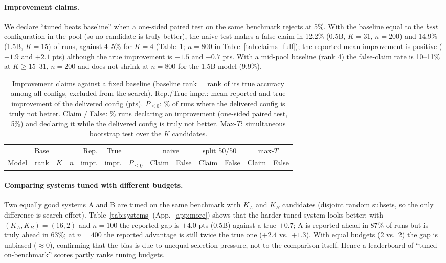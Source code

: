 \paragraph{Improvement claims.}
We declare ``tuned beats baseline'' when a one-sided paired test on the same benchmark rejects at 5\%. With the baseline equal to the \emph{best} configuration in the pool (so no candidate is truly better), the naive test makes a false claim in 12.2\% (0.5B, $K{=}31$, $n{=}200$) and 14.9\% (1.5B, $K{=}15$) of runs, against 4--5\% for $K{=}4$ (Table~\ref{tab:claims}; $n{=}800$ in Table~\ref{tab:claims_full}); the reported mean improvement is positive ($+1.9$ and $+2.1$ pts) although the true improvement is $-1.5$ and $-0.7$ pts.
With a mid-pool baseline (rank 4) the false-claim rate is 10--11\% at $K\ge15$--31, $n{=}200$ and does not shrink at $n=800$ for the 1.5B model (9.9\%).
\begin{table}[t]
\caption{Improvement claims against a fixed baseline (baseline rank = rank of its true accuracy among all configs, excluded from the search). Rep./True impr.: mean reported and true improvement of the delivered config (pts). $P_{\le0}$: \% of runs where the delivered config is truly not better. Claim / False: \% runs declaring an improvement (one-sided paired test, 5\%) and declaring it while the delivered config is truly not better. Max-$T$: simultaneous bootstrap test over the $K$ candidates.}\label{tab:claims}
\centering\footnotesize\setlength{\tabcolsep}{2.8pt}
\begin{tabular}{lrrrrrrrrrrrr}
\toprule & Base & & & Rep. & True & & \multicolumn{2}{c}{naive} & \multicolumn{2}{c}{split 50/50} & \multicolumn{2}{c}{max-$T$}\\
\cmidrule(lr){8-9}\cmidrule(lr){10-11}\cmidrule(lr){12-13}
Model & rank & $K$ & $n$ & impr. & impr. & $P_{\le0}$ & Claim & False & Claim & False & Claim & False\\ \midrule
\end{tabular}
\end{table}
\paragraph{Comparing systems tuned with different budgets.}
Two equally good systems A and B are tuned on the same benchmark with $K_A$ and $K_B$ candidates (disjoint random subsets, so the only difference is search effort). Table~\ref{tab:systems} (App.~\ref{app:more}) shows that the harder-tuned system looks better: with $(K_A,K_B)=(16,2)$ and $n=100$ the reported gap is $+4.0$ pts (0.5B) against a true $+0.7$; A is reported ahead in 87\% of runs but is truly ahead in 63\%; at $n=400$ the reported advantage is still twice the true one ($+2.4$ vs.\ $+1.3$). With equal budgets (2 vs.\ 2) the gap is unbiased ($\approx0$), confirming that the bias is due to unequal selection pressure, not to the comparison itself. Hence a leaderboard of ``tuned-on-benchmark'' scores partly ranks tuning budgets.

